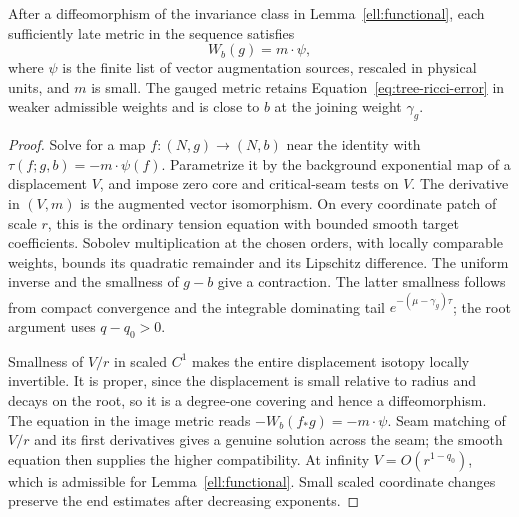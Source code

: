 \begin{lemma}
\label{ell:gauge}
After a diffeomorphism of the invariance class in
Lemma~\ref{ell:functional}, each sufficiently late metric in the
sequence satisfies
\begin{equation}
 W_b(g)=m\cdot\psi,
 \label{ell:gauge-equation}
\end{equation}
where $\psi$ is the finite list of vector augmentation sources,
rescaled in physical units, and $m$ is small.  The gauged metric
retains Equation~\eqref{eq:tree-ricci-error} in weaker admissible
weights and is close to $b$ at the joining weight $\gamma_g$.
\end{lemma}

\begin{proof}
Solve for a map $f:(N,g)\to(N,b)$ near the identity with
$\tau(f;g,b)=-m\cdot\psi(f)$.  Parametrize it by the background
exponential map of a displacement $V$, and impose zero core and
critical-seam tests on $V$.  The derivative in $(V,m)$ is the
augmented vector isomorphism.  On every coordinate patch of scale
$r$, this is the ordinary tension equation with bounded smooth
target coefficients.  Sobolev multiplication at the chosen
orders, with locally comparable weights, bounds its quadratic
remainder and its Lipschitz difference.  The uniform inverse and
the smallness of $g-b$ give a contraction.  The latter smallness
follows from compact convergence and the integrable dominating
tail $e^{-(\mu-\gamma_g)\tau}$; the root argument uses $q-q_0>0$.

Smallness of $V/r$ in scaled $C^1$ makes the entire displacement
isotopy locally invertible.  It is proper, since the displacement
is small relative to radius and decays on the root, so it is a
degree-one covering and hence a diffeomorphism.  The equation in
the image metric reads $-W_b(f_*g)=-m\cdot\psi$.
Seam matching of $V/r$ and its first derivatives gives a genuine
solution across the seam; the smooth equation then supplies the
higher compatibility.  At infinity $V=O(r^{1-q_0})$, which is
admissible for Lemma~\ref{ell:functional}.  Small scaled coordinate
changes preserve the end estimates after decreasing exponents.
\end{proof}

